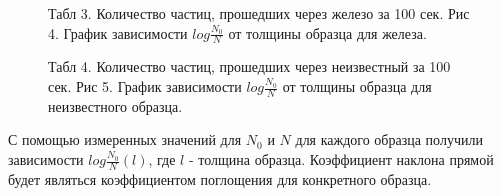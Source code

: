 \documentclass[12pt]{article}
\begin{document}
  \begin {figure}[h!]
    \begin{minipage}[h]{0.49\linewidth}
      Табл 3. Количество частиц, прошедших через железо за 100 сек.
      Рис 4. График зависимости $log\frac{N_0}{N}$ от толщины образца для
      железа.
    \end{minipage}
    \hspace{0.5cm}
    \begin{minipage}[h]{0.49\linewidth}
      Табл 4. Количество частиц, прошедших через неизвестный за 100 сек.
      Рис 5. График зависимости $log\frac{N_0}{N}$ от толщины образца для
      неизвестного образца.
    \end{minipage}
    \label {fig:ferrum-unknown}
  \end {figure}

  С помощью измеренных значений для $N_0$ и $N$ для каждого образца получили
  зависимости $log\frac{N_0}{N}(l)$, где $l$ - толщина образца.
  Коэффициент наклона прямой будет являться коэффициентом поглощения для
  конкретного образца.
\end{document}
